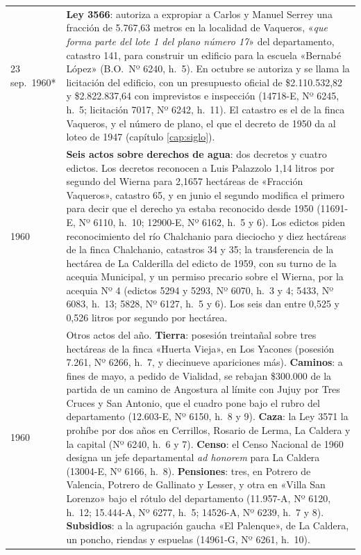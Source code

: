 \begin{longtable}{@{}p{2.7cm}p{10.3cm}@{}}
23 sep.\ 1960* & \textbf{Ley 3566}: autoriza a expropiar a Carlos y Manuel Serrey\index{Serrey, Carlos}\index{Serrey, Manuel} una fracción de 5.767,63 metros en la localidad de Vaqueros, «\textit{que forma parte del lote 1 del plano número 17}» del departamento, catastro 141, para construir un edificio para la escuela «Bernabé López» (B.O.\ Nº 6240, h.\ 5). En octubre se autoriza y se llama la licitación del edificio, con un presupuesto oficial de \$2.110.532,82 y \$2.822.837,64 con imprevistos e inspección (14718-E, Nº 6245, h.\ 5; licitación 7017, Nº 6242, h.\ 11). El catastro es el de la finca Vaqueros, y el número de plano, el que el decreto de 1950 da al loteo de 1947 (capítulo \ref{cap:siglo}). \\
1960 & \textbf{Seis actos sobre derechos de agua}: dos decretos y cuatro edictos. Los decretos reconocen a Luis Palazzolo 1,14 litros por segundo del Wierna para 2,1657 hectáreas de «Fracción Vaqueros», catastro 65, y en junio el segundo modifica el primero para decir que el derecho ya estaba reconocido desde 1950 (11691-E, Nº 6110, h.\ 10; 12900-E, Nº 6162, h.\ 5 y 6). Los edictos piden reconocimiento del río Chalchanio para dieciocho y diez hectáreas de la finca Chalchanio, catastros 34 y 35; la transferencia de la hectárea de La Calderilla del edicto de 1959, con su turno de la acequia Municipal, y un permiso precario sobre el Wierna, por la acequia Nº 4 (edictos 5294 y 5293, Nº 6070, h.\ 3 y 4; 5433, Nº 6083, h.\ 13; 5828, Nº 6127, h.\ 5 y 6). Los seis dan entre 0,525 y 0,526 litros por segundo por hectárea. \\
1960 & Otros actos del año. \textbf{Tierra}: posesión treintañal sobre tres hectáreas de la finca «Huerta Vieja», en Los Yacones (posesión 7.261, Nº 6266, h.\ 7, y diecinueve apariciones más). \textbf{Caminos}: a fines de mayo, a pedido de Vialidad, se rebajan \$300.000 de la partida de un camino de Angostura al límite con Jujuy por Tres Cruces y San Antonio, que el cuadro pone bajo el rubro del departamento (12.603-E, Nº 6150, h.\ 8 y 9). \textbf{Caza}: la Ley 3571 la prohíbe por dos años en Cerrillos, Rosario de Lerma, La Caldera y la capital (Nº 6240, h.\ 6 y 7). \textbf{Censo}: el Censo Nacional de 1960 designa un jefe departamental \textit{ad honorem} para La Caldera (13004-E, Nº 6166, h.\ 8). \textbf{Pensiones}: tres, en Potrero de Valencia, Potrero de Gallinato y Lesser, y otra en «Villa San Lorenzo» bajo el rótulo del departamento (11.957-A, Nº 6120, h.\ 12; 15.444-A, Nº 6277, h.\ 5; 14526-A, Nº 6239, h.\ 7 y 8). \textbf{Subsidios}: a la agrupación gaucha «El Palenque», de La Caldera, un poncho, riendas y espuelas (14961-G, Nº 6261, h.\ 10). \\

\end{longtable}
